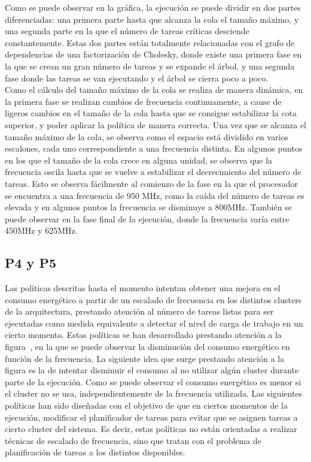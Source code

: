 Como se puede observar en la gráfica, la ejecución se puede dividir en dos
partes diferenciadas: una primera parte hasta que alcanza la cola el tamaño
máximo, y una segunda parte en la que el número de tareas críticas
desciende constantemente. Estas dos partes están totalmente relacionadas
con el grafo de dependencias de una factorización de Cholesky, donde existe
una primera fase en la que se crean un gran número de tareas y se expande
el árbol, y una segunda fase donde las tareas se van ejecutando y el árbol
se cierra poco a poco.\\
Como el cálculo del tamaño máximo de la cola se realiza de manera dinámica,
en la primera fase se realizan cambios de frecuencia continuamente, a cause
de ligeros cambios en el tamaño de la cola hasta que se consigue
estabilizar la cota superior, y poder aplicar la política de manera
correcta. Una vez que se alcanza el tamaño máximo de la cola, se observa
como el espacio está dividido en varios escalones, cada uno correspondiente
a una frecuencia distinta. En algunos puntos en los que el tamaño de la
cola crece en alguna unidad, se observa que la frecuencia oscila hasta que
se vuelve a estabilizar el decrecimiento del número de tareas. Esto se
observa fácilmente al comienzo de la fase en la que el procesador se
encuentra a una frecuencia de 950 MHz, como la caída del número de tareas
es elevada y en algunos puntos la frecuencia se disminuye a 800MHz. También
se puede observar en la fase final de la ejecución, donde la frecuencia
varía entre 450MHz y 625MHz.


\subsection{P4 y P5}
Las políticas descritas hasta el momento intentan obtener una mejora en el
consumo energético a partir de un escalado de frecuencia en los distintos
clusters de la arquitectura, prestando atención al número de tareas listas
para ser ejecutadas como medida equivalente a detectar el nivel de carga de
trabajo en un cierto momento. Estas políticas se han desarrollado prestando
atención a la figura~, en la que se puede observar la disminución
del consumo energético en función de la frecuencia. La siguiente idea que
surge prestando atención a la figura es la de intentar disminuir el consumo
al no utilizar algún cluster durante parte de la ejecución. Como se puede
observar el consumo energético es menor si el cluster no se usa,
independientemente de la frecuencia utilizada. Las siguientes políticas han
sido diseñadas con el objetivo de que en ciertos momentos de la ejecución,
modificar el planificador de tareas para evitar que se asignen tareas a
cierto cluster del sistema. Es decir, estas políticas no están orientadas a
realizar técnicas de escalado de frecuencia, sino que tratan con el
problema de planificación de tareas a los distintos \wts disponibles.\\

